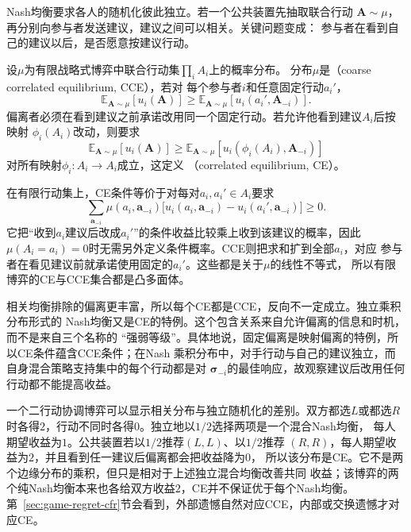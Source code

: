 Nash均衡要求各人的随机化彼此独立。若一个公共装置先抽取联合行动
\(\bm{A}\sim\mu\)，再分别向参与者发送建议，建议之间可以相关。关键问题变成：
参与者在看到自己的建议以后，是否愿意按建议行动。

\begin{definition}[粗相关均衡与相关均衡]
\label{def:game-coarse-correlated-equilibrium}
设$\mu$为有限战略式博弈中联合行动集$\prod_i A_i$上的概率分布。
分布\(\mu\)是（coarse correlated equilibrium, CCE），若对
每个参与者\(i\)和任意固定行动\(a_i'\)，
\begin{equation}
  \mathbb{E}_{\bm{A}\sim\mu}[u_i(\bm{A})]
  \geq
  \mathbb{E}_{\bm{A}\sim\mu}
  [u_i(a_i',\bm{A}_{-i})].
  \label{eq:game-cce}
\end{equation}
偏离者必须在看到建议之前承诺改用同一个固定行动。若允许他看到建议\(A_i\)后按映射
\(\phi_i(A_i)\)改动，则要求
\begin{equation}
  \mathbb{E}_{\bm{A}\sim\mu}[u_i(\bm{A})]
  \geq
  \mathbb{E}_{\bm{A}\sim\mu}
  [u_i(\phi_i(A_i),\bm{A}_{-i})]
  \label{eq:game-correlated-equilibrium}
\end{equation}
对所有映射\(\phi_i:A_i\to A_i\)成立，这定义
（correlated equilibrium, CE）。
\end{definition}

在有限行动集上，CE条件等价于对每对\(a_i,a_i'\in A_i\)要求
\begin{equation}
  \sum_{\bm{a}_{-i}}
  \mu(a_i,\bm{a}_{-i})
  \bigl[
    u_i(a_i,\bm{a}_{-i})
    -
    u_i(a_i',\bm{a}_{-i})
  \bigr]
  \geq0.
  \label{eq:game-ce-linear-constraints}
\end{equation}
它把“收到\(a_i\)建议后改成\(a_i'\)”的条件收益比较乘上收到该建议的概率，因此
\(\mu(A_i=a_i)=0\)时无需另外定义条件概率。CCE则把求和扩到全部\(a_i\)，对应
参与者在看见建议前就承诺使用固定的\(a_i'\)。这些都是关于\(\mu\)的线性不等式，
所以有限博弈的CE与CCE集合都是凸多面体。

相关均衡排除的偏离更丰富，所以每个CE都是CCE，反向不一定成立。独立乘积分布形式的
Nash均衡又是CE的特例。这个包含关系来自允许偏离的信息和时机，而不是来自三个名称的
“强弱等级”。具体地说，固定偏离是映射偏离的特例，所以CE条件蕴含CCE条件；在Nash
乘积分布中，对手行动与自己的建议独立，而自身混合策略支持集中的每个行动都是对
\(\bm{\sigma}_{-i}\)的最佳响应，故观察建议后改用任何行动都不能提高收益。

一个二行动协调博弈可以显示相关分布与独立随机化的差别。双方都选\(L\)或都选\(R\)
时各得\(2\)，行动不同时各得\(0\)。独立地以\(1/2\)选择两项是一个混合Nash均衡，
每人期望收益为\(1\)。公共装置若以\(1/2\)推荐\((L,L)\)、以\(1/2\)推荐
\((R,R)\)，每人期望收益为\(2\)，并且看到任一建议后偏离都会把收益降为\(0\)，
所以该分布是CE。它不是两个边缘分布的乘积，但只是相对于上述独立混合均衡改善共同
收益；该博弈的两个纯Nash均衡本来也各给双方收益\(2\)，CE并不保证优于每个Nash均衡。
第~\ref{sec:game-regret-cfr}节会看到，外部遗憾自然对应CCE，内部或交换遗憾才对应CE。

